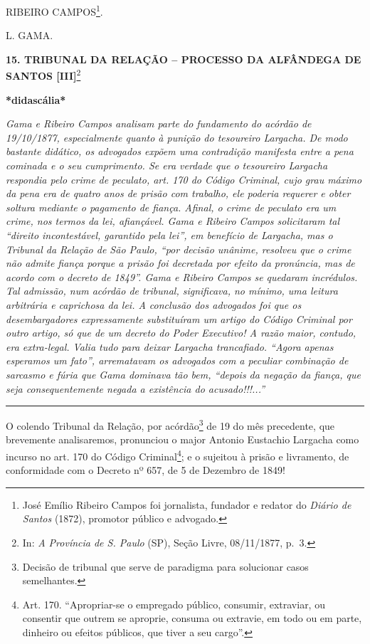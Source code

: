 RIBEIRO CAMPOS\footnote{José Emílio Ribeiro Campos foi jornalista,
  fundador e redator do \emph{Diário de Santos} (1872), promotor público
  e advogado.}.

L. GAMA.

\textbf{15. TRIBUNAL DA RELAÇÃO -- PROCESSO DA ALFÂNDEGA DE SANTOS
{[}III{]}}\footnote{In: \emph{A Província de S. Paulo} (SP), Seção
  Livre, 08/11/1877, p.~3.}

\textbf{*didascália*}

\emph{Gama e Ribeiro Campos analisam parte do fundamento do acórdão de
19/10/1877, especialmente quanto à punição do tesoureiro Largacha. De
modo bastante didático, os advogados expõem uma contradição manifesta
entre a pena cominada e o seu cumprimento. Se era verdade que o
tesoureiro Largacha respondia pelo crime de peculato, art. 170 do Código
Criminal, cujo grau máximo da pena era de quatro anos de prisão com
trabalho, ele poderia requerer e obter soltura mediante o pagamento de
fiança. Afinal, o crime de peculato era um crime, nos termos da lei,
afiançável. Gama e Ribeiro Campos solicitaram tal ``direito
incontestável, garantido pela lei'', em benefício de Largacha, mas o
Tribunal da Relação de São Paulo, ``por decisão unânime, resolveu que o
crime não admite fiança porque a prisão foi decretada por efeito da
pronúncia, mas de acordo com o decreto de 1849''. Gama e Ribeiro Campos
se quedaram incrédulos. Tal admissão, num acórdão de tribunal,
significava, no mínimo, uma leitura arbitrária e caprichosa da lei. A
conclusão dos advogados foi que os desembargadores expressamente
substituíram um artigo do Código Criminal por outro artigo, só que de um
decreto do Poder Executivo! A razão maior, contudo, era extra-legal.
Valia tudo para deixar Largacha trancafiado. ``Agora apenas esperamos um
fato'', arrematavam os advogados com a peculiar combinação de sarcasmo e
fúria que Gama dominava tão bem, ``depois da negação da fiança, que seja
consequentemente negada a existência do acusado!!!...''}

\begin{center}\rule{0.5\linewidth}{\linethickness}\end{center}

O colendo Tribunal da Relação, por acórdão\footnote{Decisão de tribunal
  que serve de paradigma para solucionar casos semelhantes.} de 19 do
mês precedente, que brevemente analisaremos, pronunciou o major Antonio
Eustachio Largacha como incurso no art. 170 do Código Criminal\footnote{Art.
  170. ``Apropriar-se o empregado público, consumir, extraviar, ou
  consentir que outrem se aproprie, consuma ou extravie, em todo ou em
  parte, dinheiro ou efeitos públicos, que tiver a seu cargo''.}; e o
sujeitou à prisão e livramento, de conformidade com o Decreto nº 657, de
5 de Dezembro de 1849!

